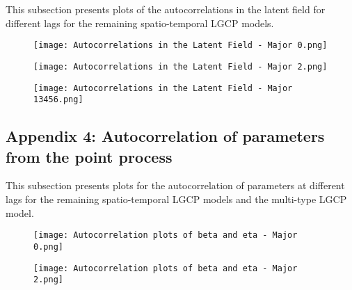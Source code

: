\documentclass[a4paper]{thesis}
\begin{document}
This subsection presents plots of the autocorrelations in the latent field for different lags for the remaining spatio-temporal LGCP models. 

\begin{figure}[H]
\begin{center}
\texttt{[image: Autocorrelations in the Latent Field - Major 0.png]}
\end{center}
\end{figure}

\begin{figure}[H]
\begin{center}
\texttt{[image: Autocorrelations in the Latent Field - Major 2.png]}
\end{center}
\end{figure}

\begin{figure}[H]
\begin{center}
\texttt{[image: Autocorrelations in the Latent Field - Major 13456.png]}
\end{center}
\end{figure}

\subsection{Appendix 4: Autocorrelation of parameters from the point process}

This subsection presents plots for the autocorrelation of parameters at different lags for the remaining spatio-temporal LGCP models and the multi-type LGCP model. 

\begin{figure}[H]
\begin{center}
\texttt{[image: Autocorrelation plots of beta and eta - Major 0.png]}
\end{center}
\end{figure}

\begin{figure}[H]
\begin{center}
\texttt{[image: Autocorrelation plots of beta and eta - Major 2.png]}
\end{center}
\end{figure}
\end{document}
